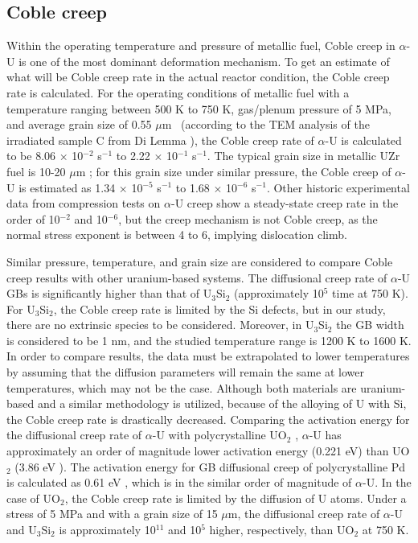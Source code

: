 \documentclass[review]{elsarticle}
\begin{document}
\subsection{Coble creep}

Within the operating temperature and pressure of metallic fuel, Coble creep in $\alpha$-U is one of the most dominant deformation mechanism. To get an estimate of what will be Coble creep rate in the actual reactor condition, the Coble creep rate is calculated. For the operating conditions of metallic fuel \cite{recent_review} with a temperature ranging between 500 K to 750 K, gas/plenum pressure of 5 MPa, and average grain size of 0.55 $\mu$m \ (according to the TEM analysis of the irradiated sample C from Di Lemma \cite{DILEMMA2020152467}), the Coble creep rate of $\alpha$-U is calculated to be 8.06 $\times$ 10$^{-2}$ s$^{-1}$ to 2.22 $\times$ 10$^{-1}$ s$^{-1}$. The typical grain size in metallic UZr fuel is 10-20 $\mu$m \cite{osti_1469797}; for this grain size under similar pressure, the Coble creep of $\alpha$-U is estimated as 1.34 $\times$ 10$^{-5}$ s$^{-1}$ to 1.68 $\times$ 10$^{-6}$ s$^{-1}$. Other historic experimental data \cite{ROBINSON1973293} from compression tests on $\alpha$-U creep show a steady-state creep rate in the order of 10$^{-2}$ and 10$^{-6}$, but the creep mechanism is not Coble creep, as the normal stress exponent is between 4 to 6, implying dislocation climb. 

Similar pressure, temperature, and grain size are considered to compare Coble creep results with other uranium-based systems. The diffusional creep rate of $\alpha$-U GBs is significantly higher than that of U$_\mathrm{3}$Si$_\mathrm{2}$ (approximately 10$^{5}$ time at 750 K). For U$_\mathrm{3}$Si$_\mathrm{2}$, the Coble creep rate is limited by the Si defects, but in our study, there are no extrinsic species to be considered. Moreover, in U$_\mathrm{3}$Si$_\mathrm{2}$ \cite{COOPER2021153129} the GB width is considered to be 1 nm, and the studied temperature range is 1200 K to 1600 K. In order to compare results, the data must be extrapolated to lower temperatures by assuming that the diffusion parameters will remain the same at lower temperatures, which may not be the case. Although both materials are uranium-based and a similar methodology is utilized, because of the alloying of U with Si, the Coble creep rate is drastically decreased. Comparing the activation energy for the diffusional creep rate of $\alpha$-U with polycrystalline UO$_\mathrm{2}$ \cite{DESAI20084489}, $\alpha$-U has approximately an order of magnitude lower activation energy (0.221 eV) than UO$_\mathrm{2}$ (3.86 eV \cite{DESAI20084489}). The activation energy for GB diffusional creep of polycrystalline Pd is calculated as 0.61 eV \cite{YAMAKOV200261_Pd_creep}, which is in the similar order of magnitude of $\alpha$-U. In the case of UO$_2$, the Coble creep rate is limited by the diffusion of U atoms. Under a stress of 5 MPa and with a grain size of 15 $\mu$m, the diffusional creep rate of $\alpha$-U and U$_\mathrm{3}$Si$_\mathrm{2}$ is approximately 10$^{11}$ and 10$^{5}$ higher, respectively, than UO$_\mathrm{2}$ at 750 K.  
\end{document}
